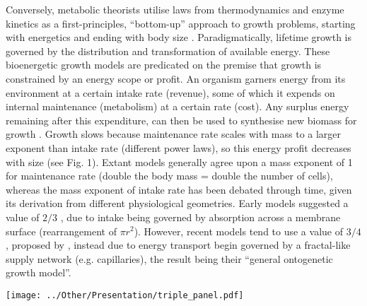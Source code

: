 \documentclass[a4paper]{article} %
\begin{document}
    Conversely, metabolic theorists utilise laws from thermodynamics and enzyme kinetics as a first-principles, ``bottom-up'' approach to growth problems, starting with energetics and ending with body size \autocite{Brown2004}. Paradigmatically, lifetime growth is governed by the distribution and transformation of available energy. These bioenergetic growth models are predicated on the premise that growth is constrained by an energy scope or profit. An organism garners energy from its environment at a certain intake rate (revenue), some of which it expends on internal maintenance (metabolism) at a certain rate (cost). Any surplus energy remaining after this expenditure, can then be used to synthesise new biomass for growth \autocite{Holdway1984, Rochet2001, Enberg2012, VanGemert2019}. Growth slows because maintenance rate scales with mass to a larger exponent than intake rate (different power laws), so this energy profit decreases with size (see Fig. 1). Extant models generally agree upon a mass exponent of 1 for maintenance rate (double the body mass = double the number of cells), whereas the mass exponent of intake rate has been debated through time, given its derivation from different physiological geometries. Early models suggested a value of $2/3$ \autocite{Putter1920,vonBert1938, VonBertalanffy1957}, due to intake being governed by absorption across a membrane surface (rearrangement of $\pi r^2$). However, recent models tend to use a value of $3/4$, proposed by \textcite{West1997}, instead due to energy transport begin governed by a fractal-like supply network (e.g. capillaries), the result being their ``general ontogenetic growth model''.

    \begin{center}
        \begin{minipage}{\linewidth}
        \texttt{[image: ../Other/Presentation/triple\_panel.pdf]}
        \label{growth_schedules}
        \end{minipage}%
    \end{center}
\end{document}
